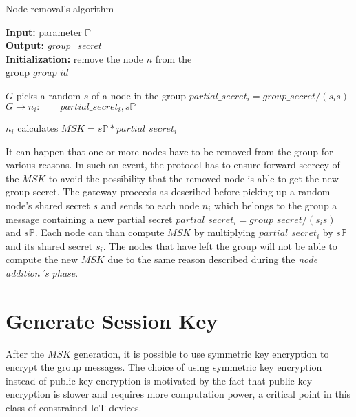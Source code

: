 \begin{algorithm}[H]
\caption{Node removal's algorithm }\label{alg:remNode}
\hspace*{\algorithmicindent} \textbf{Input:} parameter $\mathbb{P}$ \\
\hspace*{\algorithmicindent} \textbf{Output:} \textit{group\_secret} \\
\hspace*{\algorithmicindent} \textbf{Initialization:} remove the node $n$ from the \\
\hspace*{\algorithmicindent} group $group\_id$\\
\begin{algorithmic}[1]
\State $G$ picks a random $s$ of a node in the group
\State $partial\_secret_i = group\_secret / (s_i s)$
\State $G \rightarrow n_i: \qquad partial\_secret_i , s \mathbb{P}$
\EndFor{}

\State $n_i$ calculates $MSK = s \mathbb{P} * partial\_secret_i$\\
\end{algorithmic}
\end{algorithm}

It can happen that one or more nodes have to be removed from the group for various reasons. In such an event, the protocol has to ensure forward secrecy of the $MSK$ to avoid the possibility that the removed node is able to get the new group secret. 
The gateway proceeds as described before picking up a random node's shared secret $s$ and sends to each node $n_i$ which belongs to the group a message containing a new partial secret $partial\_secret_i = group\_secret / (s_i s)$ and $s\mathbb{P}$. 
Each node can than compute $MSK$ by multiplying $partial\_secret_i$ by $s\mathbb{P}$ and its shared secret $s_i$. 
The nodes that have left the group will not be able to compute the new $MSK$ due to the same reason described during the \textit{node addition´s phase}.

\section{Generate Session Key}
After the $MSK$ generation, it is possible to use symmetric key encryption to encrypt the group messages. The choice of using symmetric key encryption instead of public key encryption is motivated by the fact that public key encryption is slower and requires more computation power, a critical point in this class of constrained IoT devices. 


